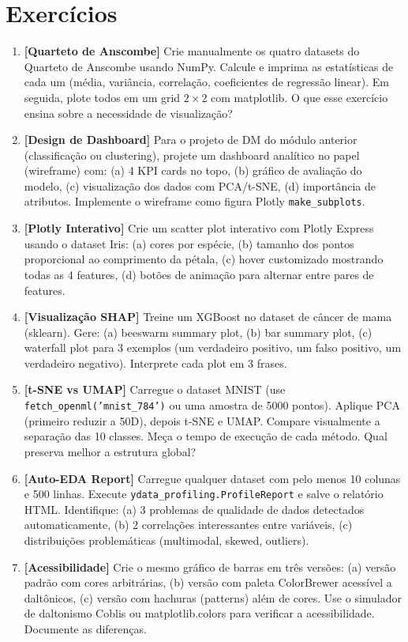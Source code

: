 \documentclass[12pt,a4paper]{article}
\begin{document}
\section{Exercícios}

\begin{enumerate}[label=\textbf{\arabic*.}, itemsep=0.5em]
  \item \textbf{[Quarteto de Anscombe]} Crie manualmente os quatro datasets do Quarteto de Anscombe usando NumPy. Calcule e imprima as estatísticas de cada um (média, variância, correlação, coeficientes de regressão linear). Em seguida, plote todos em um grid $2 \times 2$ com matplotlib. O que esse exercício ensina sobre a necessidade de visualização?

  \item \textbf{[Design de Dashboard]} Para o projeto de DM do módulo anterior (classificação ou clustering), projete um dashboard analítico no papel (wireframe) com: (a) 4 KPI cards no topo, (b) gráfico de avaliação do modelo, (c) visualização dos dados com PCA/t-SNE, (d) importância de atributos. Implemente o wireframe como figura Plotly \texttt{make\_subplots}.

  \item \textbf{[Plotly Interativo]} Crie um scatter plot interativo com Plotly Express usando o dataset Iris: (a) cores por espécie, (b) tamanho dos pontos proporcional ao comprimento da pétala, (c) hover customizado mostrando todas as 4 features, (d) botões de animação para alternar entre pares de features.

  \item \textbf{[Visualização SHAP]} Treine um XGBoost no dataset de câncer de mama (sklearn). Gere: (a) beeswarm summary plot, (b) bar summary plot, (c) waterfall plot para 3 exemplos (um verdadeiro positivo, um falso positivo, um verdadeiro negativo). Interprete cada plot em 3 frases.

  \item \textbf{[t-SNE vs UMAP]} Carregue o dataset MNIST (use \texttt{fetch\_openml('mnist\_784')} ou uma amostra de 5000 pontos). Aplique PCA (primeiro reduzir a 50D), depois t-SNE e UMAP. Compare visualmente a separação das 10 classes. Meça o tempo de execução de cada método. Qual preserva melhor a estrutura global?

  \item \textbf{[Auto-EDA Report]} Carregue qualquer dataset com pelo menos 10 colunas e 500 linhas. Execute \texttt{ydata\_profiling.ProfileReport} e salve o relatório HTML. Identifique: (a) 3 problemas de qualidade de dados detectados automaticamente, (b) 2 correlações interessantes entre variáveis, (c) distribu\-ições problemáticas (multimodal, skewed, outliers).

  \item \textbf{[Acessibilidade]} Crie o mesmo gráfico de barras em três versões: (a) versão padrão com cores arbitrárias, (b) versão com paleta ColorBrewer acessível a daltônicos, (c) versão com hachuras (patterns) além de cores. Use o simulador de daltonismo Coblis ou matplotlib.colors para verificar a acessibilidade. Documente as diferenças.
\end{enumerate}
\end{document}
